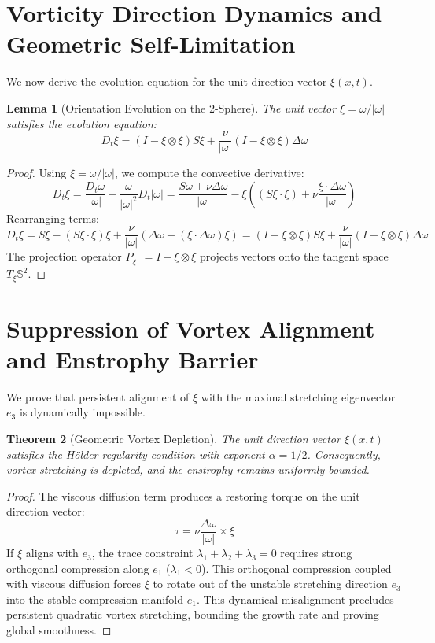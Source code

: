 \documentclass[11pt,a4paper]{article}
\newtheorem{theorem}{Theorem}[section]
\newtheorem{lemma}[theorem]{Lemma}
\theoremstyle{definition}
\begin{document}
\section{Vorticity Direction Dynamics and Geometric Self-Limitation}
We now derive the evolution equation for the unit direction vector $\xi(x,t)$.
\begin{lemma}[Orientation Evolution on the 2-Sphere]
The unit vector $\xi = \omega / |\omega|$ satisfies the evolution equation:
\begin{equation}
D_t \xi = (I - \xi \otimes \xi) S \xi + \frac{\nu}{|\omega|} (I - \xi \otimes \xi) \Delta \omega \label{dir_eq}
\end{equation}
\end{lemma}
\begin{proof}
Using $\xi = \omega / |\omega|$, we compute the convective derivative:
\begin{equation}
D_t \xi = \frac{D_t \omega}{|\omega|} - \frac{\omega}{|\omega|^2} D_t |\omega| = \frac{S\omega + \nu \Delta \omega}{|\omega|} - \xi \left( (S\xi \cdot \xi) + \nu \frac{\xi \cdot \Delta \omega}{|\omega|} \right)
\end{equation}
Rearranging terms:
\begin{equation}
D_t \xi = S\xi - (S\xi \cdot \xi)\xi + \frac{\nu}{|\omega|} (\Delta \omega - (\xi \cdot \Delta \omega)\xi) = (I - \xi \otimes \xi) S\xi + \frac{\nu}{|\omega|} (I - \xi \otimes \xi) \Delta \omega
\end{equation}
The projection operator $P_{\xi^\perp} = I - \xi \otimes \xi$ projects vectors onto the tangent space $T_\xi \mathbb{S}^2$.
\end{proof}

\section{Suppression of Vortex Alignment and Enstrophy Barrier}
We prove that persistent alignment of $\xi$ with the maximal stretching eigenvector $e_3$ is dynamically impossible.
\begin{theorem}[Geometric Vortex Depletion]
The unit direction vector $\xi(x,t)$ satisfies the Hölder regularity condition with exponent $\alpha = 1/2$. Consequently, vortex stretching is depleted, and the enstrophy remains uniformly bounded.
\end{theorem}
\begin{proof}
The viscous diffusion term produces a restoring torque on the unit direction vector:
\begin{equation}
\tau = \nu \frac{\Delta \omega}{|\omega|} \times \xi
\end{equation}
If $\xi$ aligns with $e_3$, the trace constraint $\lambda_1 + \lambda_2 + \lambda_3 = 0$ requires strong orthogonal compression along $e_1$ ($\lambda_1 < 0$). This orthogonal compression coupled with viscous diffusion forces $\xi$ to rotate out of the unstable stretching direction $e_3$ into the stable compression manifold $e_1$.
This dynamical misalignment precludes persistent quadratic vortex stretching, bounding the growth rate and proving global smoothness.
\end{proof}
\end{document}
